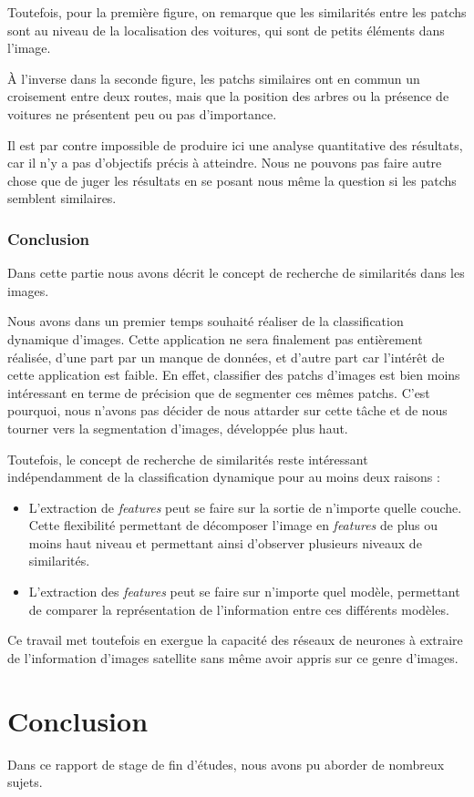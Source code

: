 \documentclass[a4paper, 11pt]{report}
\begin{document}
Toutefois, pour la première figure, on remarque que les similarités entre les patchs sont au niveau de la localisation des voitures, qui sont de petits éléments dans l'image.

À l'inverse dans la seconde figure, les patchs similaires ont en commun un croisement entre deux routes, mais que la position des arbres ou la présence de voitures ne présentent peu ou pas d'importance.

Il est par contre impossible de produire ici une analyse quantitative des résultats, car il n'y a pas d'objectifs précis à atteindre. Nous ne pouvons pas faire autre chose que de juger les résultats en se posant nous même la question si les patchs semblent similaires.
\subsection{Conclusion}
Dans cette partie nous avons décrit le concept de recherche de similarités dans les images.

Nous avons dans un premier temps souhaité réaliser de la classification dynamique d'images.
Cette application ne sera finalement pas entièrement réalisée, d'une part par un manque de données, et d'autre part car l'intérêt de cette application est faible.
En effet, classifier des patchs d'images est bien moins intéressant en terme de précision que de segmenter ces mêmes patchs.
C'est pourquoi, nous n'avons pas décider de nous attarder sur cette tâche et de nous tourner vers la segmentation d'images, développée plus haut.

Toutefois, le concept de recherche de similarités reste intéressant indépendamment de la classification dynamique pour au moins deux raisons :
\begin{itemize}
	\item L'extraction de \emph{features} peut se faire sur la sortie de n'importe quelle couche. Cette flexibilité permettant de décomposer l'image en \emph{features} de plus ou moins haut niveau et permettant ainsi d'observer plusieurs niveaux de similarités.
	\item L'extraction des \emph{features} peut se faire sur n'importe quel modèle, permettant de comparer la représentation de l'information entre ces différents modèles.
\end{itemize}

Ce travail met toutefois en exergue la capacité des réseaux de neurones à extraire de l'information d'images satellite sans même avoir appris sur ce genre d'images.
\chapter{Conclusion}
Dans ce rapport de stage de fin d'études, nous avons pu aborder de nombreux sujets.
\end{document}
